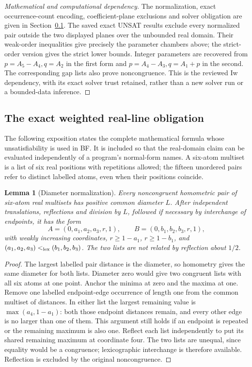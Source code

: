 \documentclass[11pt]{article}
\newtheorem{lemma}[theorem]{Lemma}
\theoremstyle{remark}
\begin{document}
\begin{proof}[Mathematical and computational dependency]
The normalization, exact occurrence-count encoding, coefficient-plane
exclusions and solver obligation are given in Section~\ref{sec:linefull}.
The saved exact UNSAT results exclude every normalized pair outside the
two displayed planes over the unbounded real domain. Their weak-order
inequalities give precisely the parameter chambers above; the strict-order
version gives the strict lower bounds. Integer parameters are recovered
from $p=A_5-A_4,q=A_2$ in the first form and
$p=A_4-A_3,q=A_1+p$ in the second. The corresponding gap lists also prove
noncongruence. This is the reviewed Iw dependency, with its exact solver
trust retained, rather than a new solver run or a bounded-data inference.
\end{proof}

\subsection{The exact weighted real-line obligation}\label{sec:linefull}

The following exposition states the complete mathematical formula whose
unsatisfiability is used in BF. It is included so that the real-domain
claim can be evaluated independently of a program's normal-form names.
A six-atom multiset is a list of six real positions with repetitions
allowed; the fifteen unordered pairs refer to distinct labelled atoms,
even when their positions coincide.

\begin{lemma}[Diameter normalization]\label{lem:linenorm}
Every noncongruent homometric pair of six-atom real multisets has positive
common diameter $L$. After independent translations, reflections and
division by $L$, followed if necessary by interchange of endpoints, it
has the form
\[
 A=(0,a_1,a_2,a_3,r,1),\qquad B=(0,b_1,b_2,b_3,r,1),
\]
with weakly increasing coordinates, $r\ge1-a_1$, $r\ge1-b_1$, and
$(a_1,a_2,a_3)<_{\rm lex}(b_1,b_2,b_3)$. The two lists are not related
by reflection about $1/2$.
\end{lemma}
\begin{proof}
The largest labelled pair distance is the diameter, so homometry gives
the same diameter for both lists. Diameter zero would give two congruent
lists with all six atoms at one point. Anchor the minima at zero and
the maxima at one. Remove one labelled endpoint-edge occurrence of
length one from the common multiset of distances. In either list the
largest remaining value is $\max(a_4,1-a_1)$: both those endpoint
distances remain, and every other edge is no larger than one of them.
This argument still holds if an endpoint is repeated or the remaining
maximum is also one. Reflect each list independently to put its shared
remaining maximum at coordinate four. The two lists are unequal, since
equality would be a congruence; lexicographic interchange is therefore
available. Reflection is excluded by the original noncongruence.
\end{proof}
\end{document}

